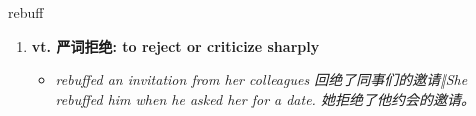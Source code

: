 
\begin{frame}
{\huge rebuff}
\begin{center}
\begin{enumerate}\Large
  \item \textbf{vt. 严词拒绝: to reject or criticize sharply}
  \begin{itemize}
    \item \em{\Large{rebuffed an invitation from her colleagues 回绝了同事们的邀请‖She rebuffed him when he asked her for a date. 她拒绝了他约会的邀请。}}
  \end{itemize}
\end{enumerate}
\end{center}
\end{frame}

